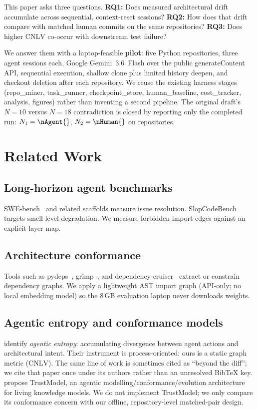 \documentclass[11pt,letterpaper,logo]{yalearxiv}
\newcommand{\CNLV}{\mathrm{CNLV}}
\begin{document}
This paper asks three questions. \textbf{RQ1:} Does measured architectural drift accumulate across sequential, context-reset sessions? \textbf{RQ2:} How does that drift compare with matched human commits on the same repositories? \textbf{RQ3:} Does higher $\CNLV$ co-occur with downstream test failure?

We answer them with a laptop-feasible \textbf{pilot}: five Python repositories, three agent sessions each, Google Gemini~3.6~Flash over the public generateContent API, sequential execution, shallow clone plus limited history deepen, and checkout deletion after each repository. We reuse the existing harness stages (repo\_miner, task\_runner, checkpoint\_store, human\_baseline, cost\_tracker, analysis, figures) rather than inventing a second pipeline. The original draft's $N=10$ versus $N=18$ contradiction is closed by reporting only the completed run: $N_1=\nAgent{}$, $N_2=\nHuman{}$ on \nRepos{} repositories.

\section{Related Work}
\label{sec:related}

\subsection{Long-horizon agent benchmarks}
SWE-bench~\citep{jimenez2024swebench} and related scaffolds measure issue resolution. SlopCodeBench~\citep{slopcodebench2026} targets smell-level degradation. We measure forbidden import edges against an explicit layer map.

\subsection{Architecture conformance}
Tools such as pydeps~\citep{pydeps}, grimp~\citep{grimp}, and dependency-cruiser~\citep{dependencycruiser} extract or constrain dependency graphs. We apply a lightweight AST import graph (API-only; no local embedding model) so the 8\,GB evaluation laptop never downloads weights.

\subsection{Agentic entropy and conformance models}
\citet{casserini2026diff} identify \emph{agentic entropy}: accumulating divergence between agent actions and architectural intent. Their instrument is process-oriented; ours is a static graph metric ($\CNLV$). The same line of work is sometimes cited as ``beyond the diff''; we cite that paper once under its authors rather than an unresolved Bib\TeX{} key. \citet{zhang2026trustmodel} propose TrustModel, an agentic modelling/conformance/evolution architecture for living knowledge models. We do not implement TrustModel; we only compare its conformance concern with our offline, repository-level matched-pair design.
\end{document}
